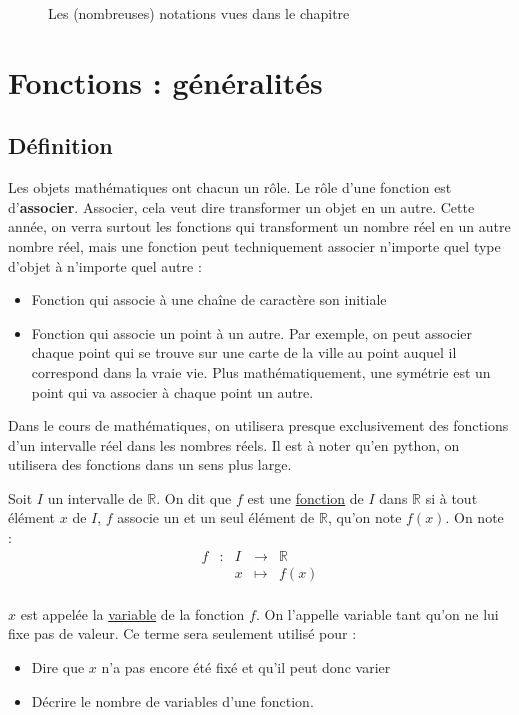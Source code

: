 \documentclass[10pt,a4paper]{book}
\newcommand{\R}{\mathbb{R}}
\begin{document}
\begin{figure}
\begin{tabular}{|c|p{0.3\linewidth}|p{0.5\linewidth}|}
 \end{tabular}
\caption{Les (nombreuses) notations vues dans le chapitre}
\label{fig:Notations}
\end{figure}


\chapter{Fonctions : généralités}

\section{Définition}

Les objets mathématiques ont chacun un rôle. Le rôle d'une fonction est d'\textbf{associer}. Associer, cela veut dire transformer un objet en un autre. Cette année, on verra surtout les fonctions qui transforment un nombre réel en un autre nombre réel, mais une fonction peut techniquement associer n'importe quel type d'objet à n'importe quel autre :
\begin{itemize}
    \item Fonction qui associe à une chaîne de caractère son initiale
    \item Fonction qui associe un point à un autre. Par exemple, on peut associer chaque point qui se trouve sur une carte de la ville au point auquel il correspond dans la vraie vie. Plus mathématiquement, une symétrie est un point qui va associer à chaque point un autre.
\end{itemize}

Dans le cours de mathématiques, on utilisera presque exclusivement des fonctions d'un intervalle réel dans les nombres réels.  Il est à noter qu'en python, on utilisera des fonctions dans un sens plus large.

\begin{de}[Fonction d'un intervalle de $\R$]
    Soit $I$ un intervalle de $\R$. On dit que $f$ est une \underline{fonction} de $I$ dans $\R$ si à tout élément $x$ de $I$,  $f$ associe un et un seul élément de $\R$, qu'on note $f(x)$.
    On note :
        \[
        \begin{array}{ccccc}
        f & : & I & \to & \R \\
         & & x & \mapsto & f(x) \\
        \end{array}
        \]
\end{de}

$x$ est appelée la \underline{variable} de la fonction $f$. On l'appelle variable tant qu'on ne lui fixe pas de valeur. Ce terme sera seulement utilisé pour : \begin{itemize}
    \item Dire que $x$ n'a pas encore été fixé et qu'il peut donc varier
    \item Décrire le nombre de variables d'une fonction.
\end{itemize}
\end{document}
